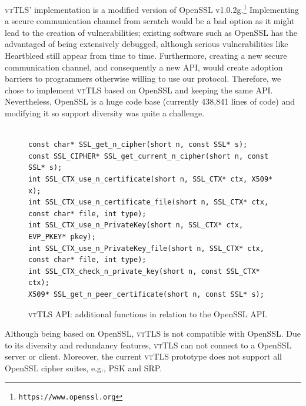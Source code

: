 \documentclass{sig-alternate-05-2015}
\begin{document}
\textsc{vtTLS}' implementation is a modified version of OpenSSL v1.0.2g.\footnote{\texttt{https://www.openssl.org}} Implementing a secure communication channel from scratch would be a bad option as it might lead to the creation of vulnerabilities; existing software such as OpenSSL has the advantaged of being extensively debugged, although serious vulnerabilities like Heartbleed still appear from time to time.
Furthermore, creating a new secure communication channel, and consequently a new API, would create adoption barriers to programmers otherwise willing to use our protocol. Therefore, we chose to implement \textsc{vtTLS} based on OpenSSL and keeping the same API. Nevertheless, OpenSSL is a huge code base (currently 438,841 lines of code) and modifying it so support diversity was quite a challenge.

\begin{figure}[tb]
\center\footnotesize
\begin{verbatim}

const char* SSL_get_n_cipher(short n, const SSL* s);
const SSL_CIPHER* SSL_get_current_n_cipher(short n, const SSL* s);
int SSL_CTX_use_n_certificate(short n, SSL_CTX* ctx, X509* x);
int SSL_CTX_use_n_certificate_file(short n, SSL_CTX* ctx, const char* file, int type);
int SSL_CTX_use_n_PrivateKey(short n, SSL_CTX* ctx, EVP_PKEY* pkey);
int SSL_CTX_use_n_PrivateKey_file(short n, SSL_CTX* ctx, const char* file, int type);
int SSL_CTX_check_n_private_key(short n, const SSL_CTX* ctx);
X509* SSL_get_n_peer_certificate(short n, const SSL* s);

\end{verbatim}
\caption{\textsc{vtTLS} API: additional functions in relation to the OpenSSL API.}
\label{fig:vtTLS-api}
\end{figure}

Although being based on OpenSSL, \textsc{vtTLS} is not compatible with OpenSSL. Due to its diversity and redundancy features, \textsc{vtTLS} can not connect to a OpenSSL server or client. %
%
Moreover, the current \textsc{vtTLS} prototype does not support all OpenSSL cipher suites, e.g., PSK and SRP.
\end{document}
